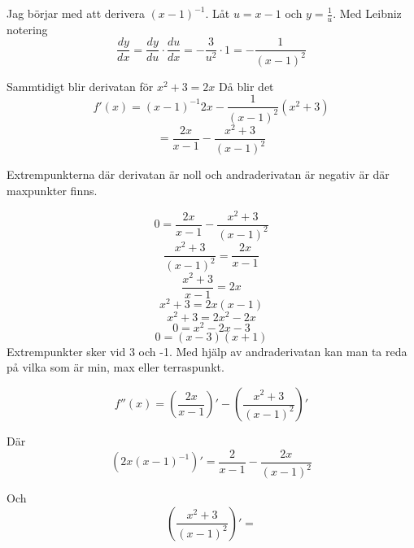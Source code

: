 \documentclass[a4paper,12pt]{article}
\begin{document}
\begin{enumerate}
    Jag börjar med att derivera $(x-1)^{-1}$.
    Låt $u=x-1$ och $y=\frac{1}{u}$.
    Med Leibniz notering 
    $$\frac{dy}{dx}=\frac{dy}{du}\cdot \frac{du}{dx}
    =-\frac{3}{u^2}\cdot 1=-\frac{1}{(x-1)^2}$$
    
    Sammtidigt blir derivatan för $x^2+3=2x$
    Då blir det 
    $$f'(x)=(x-1)^{-1}2x-\frac{1}{(x-1)^2}(x^2+3)$$
    $$=\frac{2x}{x-1}-\frac{x^2+3}{(x-1)^2}$$
    
    Extrempunkterna där derivatan är noll och
    andraderivatan är negativ är där 
    maxpunkter finns. 
    
    $$0=\frac{2x}{x-1}-\frac{x^2+3}{(x-1)^2}$$
    $$\frac{x^2+3}{(x-1)^2}=\frac{2x}{x-1}$$
    $$\frac{x^2+3}{x-1}={2x}$$
    $$x^2+3=2x(x-1)$$
    $$x^2+3=2x^2-2x$$
    $$0=x^2-2x-3$$
    $$0=(x-3)(x+1)$$
    Extrempunkter sker vid 3 och -1. Med hjälp av andraderivatan
    kan man ta reda på vilka som är min, max eller terraspunkt.
    
    $$f''(x)=(\frac{2x}{x-1})'-(\frac{x^2+3}{(x-1)^2})'$$
    
    Där 
    $$(2x(x-1)^{-1})'=\frac{2}{x-1}-\frac{2x}{(x-1)^2}$$
    
    Och
    $$(\frac{x^2+3}{(x-1)^2})'=$$

\end{enumerate}
\end{document}
